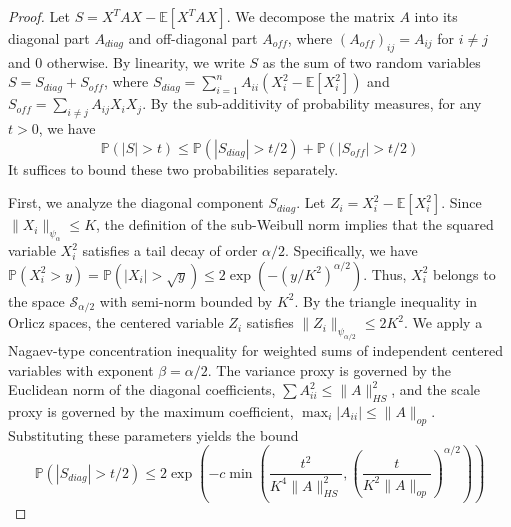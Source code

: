 \documentclass[11pt]{amsart}
\theoremstyle{definition}
\theoremstyle{remark}
\begin{document}
\begin{proof}
Let $S = X^T A X - \mathbb{E}[X^T A X]$. We decompose the matrix $A$ into its diagonal part $A_{diag}$ and off-diagonal part $A_{off}$, where $(A_{off})_{ij} = A_{ij}$ for $i \neq j$ and $0$ otherwise. By linearity, we write $S$ as the sum of two random variables $S = S_{diag} + S_{off}$, where $S_{diag} = \sum_{i=1}^n A_{ii} (X_i^2 - \mathbb{E}[X_i^2])$ and $S_{off} = \sum_{i \neq j} A_{ij} X_i X_j$. By the sub-additivity of probability measures, for any $t > 0$, we have
\begin{equation}
\mathbb{P}(|S| > t) \le \mathbb{P}(|S_{diag}| > t/2) + \mathbb{P}(|S_{off}| > t/2)
\end{equation}
It suffices to bound these two probabilities separately.

First, we analyze the diagonal component $S_{diag}$. Let $Z_i = X_i^2 - \mathbb{E}[X_i^2]$. Since $\|X_i\|_{\psi_\alpha} \le K$, the definition of the sub-Weibull norm implies that the squared variable $X_i^2$ satisfies a tail decay of order $\alpha/2$. Specifically, we have $\mathbb{P}(X_i^2 > y) = \mathbb{P}(|X_i| > \sqrt{y}) \le 2 \exp(-(y/K^2)^{\alpha/2})$. Thus, $X_i^2$ belongs to the space $\mathcal{S}_{\alpha/2}$ with semi-norm bounded by $K^2$. By the triangle inequality in Orlicz spaces, the centered variable $Z_i$ satisfies $\|Z_i\|_{\psi_{\alpha/2}} \le 2K^2$. We apply a Nagaev-type concentration inequality for weighted sums of independent centered variables with exponent $\beta = \alpha/2$. The variance proxy is governed by the Euclidean norm of the diagonal coefficients, $\sum A_{ii}^2 \le \|A\|_{HS}^2$, and the scale proxy is governed by the maximum coefficient, $\max_i |A_{ii}| \le \|A\|_{op}$. Substituting these parameters yields the bound
\begin{equation}
\mathbb{P}(|S_{diag}| > t/2) \le 2 \exp\left( -c \min\left( \frac{t^2}{K^4 \|A\|_{HS}^2}, \left( \frac{t}{K^2 \|A\|_{op}} \right)^{\alpha/2} \right) \right)
\end{equation}


\end{proof}
\end{document}
